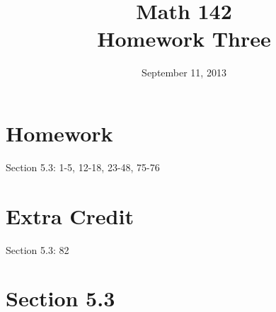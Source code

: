 \documentclass{exam}
\author{}
\date{September 11, 2013}
\title{Math 142 \\ Homework Three}
\begin{document}
  \maketitle

  \section{Homework}
  Section 5.3: 1-5, 12-18, 23-48, 75-76

  \section{Extra Credit}
  Section 5.3: 82

  \ifprintanswers

    \section{Section 5.3}
\end{document}
